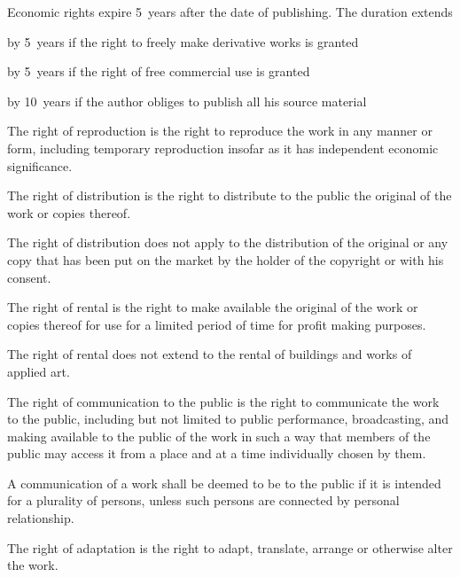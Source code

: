 \begin{contract}
\Sentence Economic rights expire 5~years after the date of publishing. The duration extends
\begin{legalenum}
	\item by 5~years if the right to  freely make derivative works is granted
	\item by 5~years if  the right of free commercial use is granted
	\item by 10~years if  the author obliges to publish all his source material
\end{legalenum}

\label{Par:RightOfReproduction}
\Sentence The right of reproduction is the right to reproduce the work in any manner 
or form, including temporary reproduction insofar as it has independent 
economic significance.

\label{Par:RightOfDistribution}
\Sentence The right of distribution is the right to distribute to the public the original 
of the work or copies thereof.

\Sentence The right of distribution does not apply to the distribution of the original 
or any copy that has been put on the market by the holder of the copyright 
or with his consent.

\label{Par:RightOfRental}
\Sentence The right of rental is the right to make available the original of the work 
or copies thereof for use for a limited period of time for profit making 
purposes.

\Sentence The right of rental does not extend to the rental of buildings and works of 
applied art.

\label{Par:RightOfCommunicationToThePublic}
\Sentence  The right of communication to the public is the right to communicate the 
work to the public, including but not limited to public performance, 
broadcasting, and making available to the public of the work in such a 
way that members of the public may access it from a place and at a time 
individually chosen by them.

\Sentence  A communication of a work shall be deemed to be to the public if it is 
intended for a plurality of persons, unless such persons are connected by 
personal relationship.

\label{Par:RightOfAdaption}
\Sentence The right of adaptation is the right to adapt, translate, arrange or otherwise 
alter the work.

\end{contract}